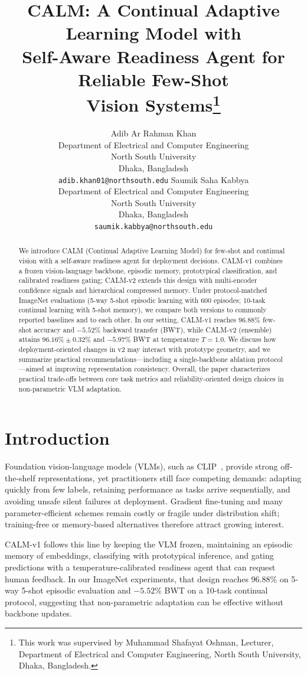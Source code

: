 \documentclass{article}
\title{CALM: A Continual Adaptive Learning Model with\\Self-Aware Readiness Agent for Reliable Few-Shot\\Vision Systems\thanks{This work was supervised by Muhammad Shafayat Oshman, Lecturer, Department of Electrical and Computer Engineering, North South University, Dhaka, Bangladesh.}}
\author{%
Adib Ar Rahman Khan \\
Department of Electrical and Computer Engineering \\
North South University \\
Dhaka, Bangladesh \\
\texttt{adib.khan01@northsouth.edu}
\And
Saumik Saha Kabbya \\
Department of Electrical and Computer Engineering \\
North South University \\
Dhaka, Bangladesh \\
\texttt{saumik.kabbya@northsouth.edu}
}
\begin{document}
\maketitle

\begin{abstract}
We introduce CALM (Continual Adaptive Learning Model) for few-shot and continual vision with a self-aware readiness agent for deployment decisions. CALM-v1 combines a frozen vision-language backbone, episodic memory, prototypical classification, and calibrated readiness gating; CALM-v2 extends this design with multi-encoder confidence signals and hierarchical compressed memory. Under protocol-matched ImageNet evaluations (5-way 5-shot episodic learning with 600 episodes; 10-task continual learning with 5-shot memory), we compare both versions to commonly reported baselines and to each other. In our setting, CALM-v1 reaches $96.88\%$ few-shot accuracy and $-5.52\%$ backward transfer (BWT), while CALM-v2 (ensemble) attains $96.16\% \pm 0.32\%$ and $-5.97\%$ BWT at temperature $T=1.0$. We discuss how deployment-oriented changes in v2 may interact with prototype geometry, and we summarize practical recommendations---including a single-backbone ablation protocol---aimed at improving representation consistency. Overall, the paper characterizes practical trade-offs between core task metrics and reliability-oriented design choices in non-parametric VLM adaptation.
\end{abstract}

\section{Introduction}
Foundation vision-language models (VLMs), such as CLIP~\citep{radford2021clip}, provide strong off-the-shelf representations, yet practitioners still face competing demands: adapting quickly from few labels, retaining performance as tasks arrive sequentially, and avoiding unsafe silent failures at deployment. Gradient fine-tuning and many parameter-efficient schemes remain costly or fragile under distribution shift; training-free or memory-based alternatives therefore attract growing interest.

CALM-v1 follows this line by keeping the VLM frozen, maintaining an episodic memory of embeddings, classifying with prototypical inference, and gating predictions with a temperature-calibrated readiness agent that can request human feedback. In our ImageNet experiments, that design reaches $96.88\%$ on 5-way 5-shot episodic evaluation and $-5.52\%$ BWT on a 10-task continual protocol, suggesting that non-parametric adaptation can be effective without backbone updates.
\end{document}
